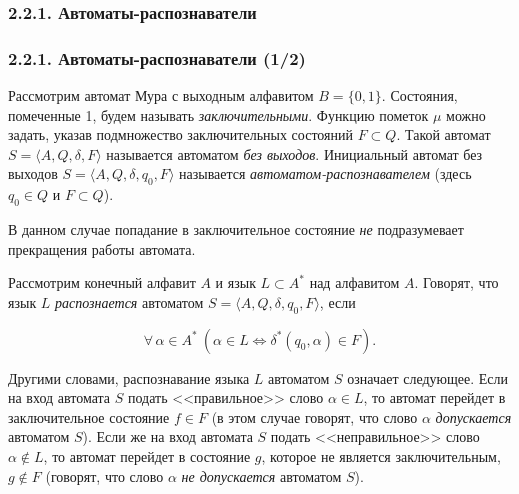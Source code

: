 \documentclass[mathserif,12pt,aspectratio=169]{beamer}
\def\emразделенной{\em разделенной}
\renewcommand{\index}[1]{}
\def\em#1{\it\color{blue}#1}
\def\odmkey#1#2{{\it\color{red} #1}\index{#2}}
\let\Equiv\Longleftrightarrow
\def\A#1#2{\forall\,#1\ \left(#2\right)}
\begin{document}
\subsubsection{2.2.1. Автоматы-распознаватели}
\label{2.2.1.}
\begin{frame}
\frametitle{2.2.1. Автоматы-распознаватели (1/2)}

Рассмотрим автомат Мура  с выходным алфавитом $B=\{0,1\}$.
Состояния, помеченные 1, будем называть
\odmkey{заключительными}{Состояние!заключительное}. Функцию
пометок $\mu$ можно задать, указав подмножество заключительных состояний $F\subset Q$.
Такой автомат $S=\langle A, Q, \delta, F
\rangle$ называется автоматом \odmkey{без выходов}{Автомат!без
выходов}. Инициальный автомат без выходов $S=\langle A, Q, \delta,
q_0, F\rangle$ называется
\odmkey{автоматом-распознавателем}{Автомат!распознаватель}
(здесь $q_0\in Q$ и
$F\subset Q$).

\begin{remark}
В данном случае попадание в заключительное состояние {\em не}
подразумевает прекращения работы автомата.
\end{remark}

Рассмотрим конечный алфавит $A$ и язык $L\subset A^*$
над алфавитом $A$.
Говорят, что язык $L$ \odmkey{распознается}{Распознавание!языка}
автоматом $S=\langle A, Q, \delta, q_0, F\rangle$, если

\vspace{-10pt}
$$
\A{\alpha\in A^* }{\alpha\in L \Equiv
\delta^*(q_0,\alpha)\in F}.
$$

\vspace{-4pt}

Другими словами, распознавание языка $L$ автоматом $S$ означает
следующее. Если на вход автомата $S$ подать <<правильное>> слово
$\alpha\in L$, то автомат перейдет в заключительное состояние
$f\in F$ (в этом случае говорят, что слово $\alpha$ {\em
допускается} автоматом $S$). Если же на вход автомата $S$ подать
<<неправильное>> слово $\alpha\not\in L$, то автомат перейдет в
состояние $g$, которое не является заключительным, $g\not\in F$
(говорят, что слово $\alpha$ {\em  не допускается} автоматом $S$).
\end{frame}
\end{document}
